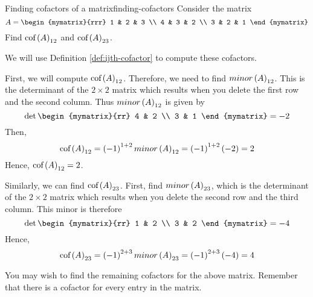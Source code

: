 \begin{example}{Finding cofactors of a matrix}{finding-cofactors}
Consider the matrix
\begin{equation*}
A=\begin{mymatrix}{rrr}
1 & 2 & 3 \\
4 & 3 & 2 \\
3 & 2 & 1
\end{mymatrix} 
\end{equation*}
Find $\mbox{\rm cof}\left(A\right) _{12}$ and $\mbox{\rm cof}\left(A\right) _{23}$.
\end{example}

\begin{solution} We will use Definition \ref{def:ijth-cofactor} to compute these cofactors. 

First, we will compute $\mbox{\rm cof}\left(A\right) _{12}$. 
Therefore, we need to find $minor\left(A\right)_{12}$. This is the determinant of the $2\times 2$ matrix
which results when you delete the first row and the second column. Thus $minor\left(A\right)_{12}$ is given by 
\begin{equation*}
\det \begin{mymatrix}{rr}
4 & 2 \\
3 & 1
\end{mymatrix} = -2
\end{equation*}
Then,
\begin{equation*}
\mbox{\rm cof}\left(A\right) _{12}=\left(-1\right) ^{1+2} minor\left(A\right)_{12} =\left(-1\right) ^{1+2}\left(-2\right) =2
\end{equation*}
Hence, $\mbox{\rm cof}\left(A\right) _{12}=2$.

Similarly, we can find $\mbox{\rm cof}\left(A\right) _{23}$. First, find $minor\left(A\right)_{23}$, which is the determinant of the $2\times 2$ matrix
which results when you delete the second row and the third column. This
minor is therefore
\begin{equation*}
\det \begin{mymatrix}{rr}
1 & 2 \\
3 & 2
\end{mymatrix} = -4
\end{equation*}
Hence,
\begin{equation*}
\mbox{\rm cof}\left(A\right) _{23}=\left(-1\right) ^{2+3} minor\left(A\right)_{23} =\left(-1\right) ^{2+3}\left(-4\right) =4
\end{equation*}
\end{solution}

You may wish to find the remaining cofactors for the above matrix. Remember that there is a cofactor 
for every entry in the matrix.  

